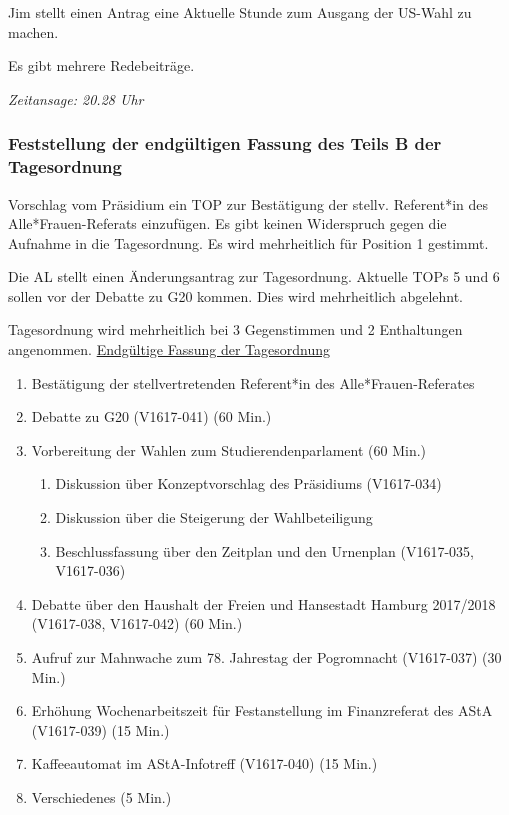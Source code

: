 \documentclass[ngerman,headheight=70pt]{scrartcl}
\begin{document}
    Jim stellt einen Antrag eine Aktuelle Stunde zum Ausgang der US-Wahl zu machen.

    Es gibt mehrere Redebeiträge.

    \textit{Zeitansage: 20.28 Uhr}

    \subsubsection{Feststellung der endgültigen Fassung des Teils B der Tagesordnung}

    Vorschlag vom Präsidium ein TOP zur Bestätigung der stellv. Referent*in des
    Alle*Frauen-Referats einzufügen.
    Es gibt keinen Widerspruch gegen die Aufnahme in die Tagesordnung.
    Es wird mehrheitlich für Position 1 gestimmt.

    Die AL stellt einen Änderungsantrag zur Tagesordnung. Aktuelle TOPs 5 und 6
    sollen vor der Debatte zu G20 kommen. Dies wird mehrheitlich abgelehnt.

    Tagesordnung wird mehrheitlich bei 3 Gegenstimmen und 2 Enthaltungen angenommen.
    \newpage
    \underline{Endgültige Fassung der Tagesordnung}
    \begin{enumerate}[label={\textbf{Top \theenumi}},leftmargin=*]
        \item Bestätigung der stellvertretenden Referent*in des Alle*Frauen-Referates
        \item Debatte zu G20 (V1617-041) (60 Min.)
        \item Vorbereitung der Wahlen zum Studierendenparlament (60 Min.)
        \begin{enumerate}
            \item Diskussion über Konzeptvorschlag des Präsidiums (V1617-034)
            \item Diskussion über die Steigerung der Wahlbeteiligung
            \item Beschlussfassung über den Zeitplan und den Urnenplan
            (V1617-035, V1617-036)
        \end{enumerate}
        \item Debatte über den Haushalt der Freien und Hansestadt Hamburg
              2017/2018 (V1617-038, V1617-042) (60 Min.)
        \item Aufruf zur Mahnwache zum 78. Jahrestag der Pogromnacht (V1617-037) (30 Min.)
        \item Erhöhung Wochenarbeitszeit für Festanstellung im Finanzreferat des AStA (V1617-039) (15 Min.)
        \item Kaffeeautomat im AStA-Infotreff (V1617-040) (15 Min.)
        \item Verschiedenes (5 Min.)
    \end{enumerate}
\end{document}
